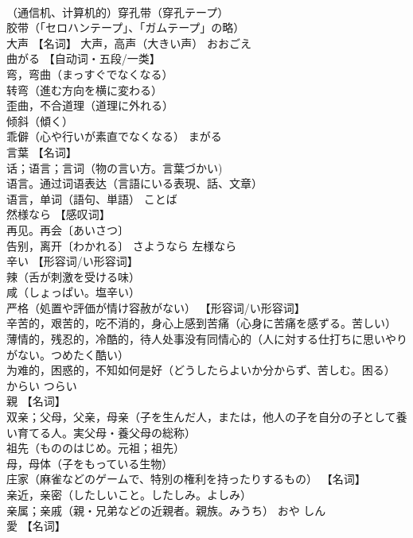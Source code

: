 \documentclass[8pt]{extreport}
\begin{document}
\begin{CJK}{UTF8}{min}
\\	（通信机、计算机的）穿孔带（穿孔テープ） 
\\	胶带（「セロハンテープ」、「ガムテープ」の略）		
\\	大声	【名词】 大声，高声（大きい声）	おおごえ	
\\	曲がる	【自动词・五段/一类】 
\\	弯，弯曲（まっすぐでなくなる） 
\\	转弯（進む方向を横に変わる） 
\\	歪曲，不合道理（道理に外れる） 
\\	倾斜（傾く） 
\\	乖僻（心や行いが素直でなくなる）	まがる	
\\	言葉	【名词】 
\\	话；语言；言词（物の言い方。言葉づかい) 
\\	语言。通过词语表达（言語にいる表現、話、文章） 
\\	语言，单词（語句、単語）	ことば	
\\	然様なら	【感叹词】 
\\	再见。再会〔あいさつ〕 
\\	告别，离开〔わかれる〕	さようなら	左様なら
\\	辛い	【形容词/い形容词】 
\\	辣（舌が刺激を受ける味） 
\\	咸（しょっぱい。塩辛い） 
\\	严格（処置や評価が情け容赦がない） 【形容词/い形容词】 
\\	辛苦的，艰苦的，吃不消的，身心上感到苦痛（心身に苦痛を感ずる。苦しい） 
\\	薄情的，残忍的，冷酷的，待人处事没有同情心的（人に対する仕打ちに思いやりがない。つめたく酷い） 
\\	为难的，困惑的，不知如何是好（どうしたらよいか分からず、苦しむ。困る）	からい つらい	
\\	親	【名词】 
\\	双亲；父母，父亲，母亲（子を生んだ人，または，他人の子を自分の子として養い育てる人。実父母・養父母の総称） 
\\	祖先（もののはじめ。元祖；祖先） 
\\	母，母体（子をもっている生物） 
\\	庄家（麻雀などのゲームで、特別の権利を持ったりするもの） 【名词】 
\\	亲近，亲密（したしいこと。したしみ。よしみ） 
\\	亲属；亲戚（親・兄弟などの近親者。親族。みうち）	おや しん	
\\	愛	【名词】 

\end{CJK}
\end{document}

